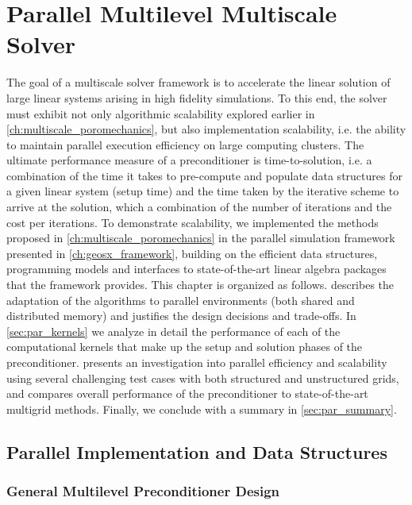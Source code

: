 \chapter{Parallel Multilevel Multiscale Solver}
\label{ch:parallel_multiscale}

The goal of a multiscale solver framework is to accelerate the linear solution of large linear systems arising in high fidelity simulations.   To this end, the solver must exhibit not only algorithmic scalability explored earlier in \cref{ch:multiscale_poromechanics}, but also implementation scalability, i.e. the ability to maintain parallel execution efficiency on large computing clusters.   The ultimate performance measure of a preconditioner is time-to-solution, i.e. a combination of the time it takes to pre-compute and populate data structures for a given linear system (setup time) and the time taken by the iterative scheme to arrive at the solution, which a combination of the number of iterations and the cost per iterations.   To demonstrate scalability, we implemented the methods proposed in \cref{ch:multiscale_poromechanics} in the parallel simulation framework presented in \cref{ch:geosx_framework}, building on the efficient data structures, programming models and interfaces to state-of-the-art linear algebra packages that the framework provides.   This chapter is organized as follows.  describes the adaptation of the algorithms to parallel environments (both shared and distributed memory) and justifies the design decisions and trade-offs.   In \cref{sec:par_kernels} we analyze in detail the performance of each of the computational kernels that make up the setup and solution phases of the preconditioner.    presents an investigation into parallel efficiency and scalability using several challenging test cases with both structured and unstructured grids, and compares overall performance of the preconditioner to state-of-the-art multigrid methods.    Finally, we conclude with a summary in \cref{sec:par_summary}.

\section{Parallel Implementation and Data Structures}
\label{sec:par_implementation}

\subsection{General Multilevel Preconditioner Design}
\label{subsec:par_impl_prec_design}


